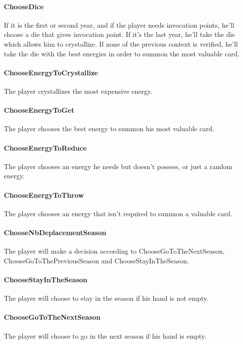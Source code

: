 \begin{appendices}
    
    \paragraph{ChooseDice}
    If it is the first or second year, and if the player needs invocation points, he'll choose a die that gives invocation point. If it's the last year, he'll take the die which allows him to crystallize. If none of the previous context is verified, he'll take the die with the best energies in order to summon the most valuable card.
    
    \paragraph{ChooseEnergyToCrystallize}
    The player crystallizes the most expensive energy.
    
    \paragraph{ChooseEnergyToGet}
    The player chooses the best energy to summon his most valuable card.

    \paragraph{ChooseEnergyToReduce}
    The player chooses an energy he needs but doesn't possess, or just a random energy.
    
    \paragraph{ChooseEnergyToThrow}
    The player chooses an energy that isn't required to summon a valuable card.

    \paragraph{ChooseNbDeplacementSeason}
    The player will make a decision according to ChooseGoToTheNextSeason, ChooseGoToThePreviousSeason and ChooseStayInTheSeason.
    
    \paragraph{ChooseStayInTheSeason}
    The player will choose to stay in the season if his hand is not empty.
    
    \paragraph{ChooseGoToTheNextSeason}
    The player will choose to go in the next season if his hand is empty.
    

\end{appendices}
